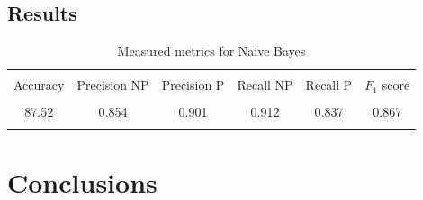 \documentclass[journal,twocolumn]{IEEEtran}
\begin{document}
\subsection{Results}

\begin{table}[H]
\caption{Measured metrics for Naive Bayes}
\begin{tabular}{cccccc}
\hline\\ [-1.5ex]
{Accuracy} & Precision NP & Precision P & Recall NP & Recall P & $F_1$ score \\ \hline\\ [-1.5ex]
87.52          & 0.854        & 0.901       & 0.912     & 0.837  &0.867  \\ \hline\\ [-1.5ex]
\end{tabular}
\end{table}

\section{Conclusions}
\label{sec:conc}

\printbibliography
\end{document}
